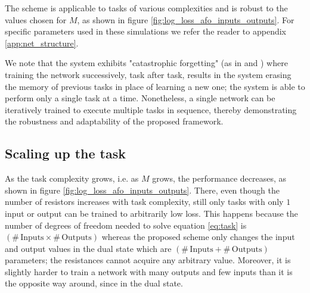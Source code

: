 \documentclass[%
 reprint,
 amsmath,amssymb,
 aps,
]{revtex4-2}
\begin{document}
    The scheme is applicable to tasks of various complexities and is robust to the values chosen for $M$, as shown in figure \ref{fig:log_loss_afo_inputs_outputs}. For specific parameters used in these simulations we refer the reader to appendix \ref{app:net_structure}.
    
    We note that the system exhibits "catastrophic forgetting" (as in \cite{FRENCH1999128} and \cite{stern2020continual}) where training the network successively, task after task, results in the system erasing the memory of previous tasks in place of learning a new one; the system is able to perform only a single task at a time. Nonetheless, a single network can be iteratively trained to execute multiple tasks in sequence, thereby demonstrating the robustness and adaptability of the proposed framework.

\subsection{Scaling up the task}\label{sec:scaling_up}

    As the task complexity grows, i.e. as $M$ grows, the performance decreases, as shown in figure \ref{fig:log_loss_afo_inputs_outputs}. There, even though the number of resistors increases with task complexity, still only tasks with only $1$ input or output can be trained to arbitrarily low loss. This happens because the number of degrees of freedom needed to solve equation \ref{eq:task} is $\left(\# \, \text{Inputs}\times \# \, \text{Outputs}\right)$ whereas the proposed scheme only changes the input and output values in the dual state which are $\left(\# \, \text{Inputs}+\# \, \text{Outputs}\right)$ parameters; the resistances cannot acquire any arbitrary value. Moreover, it is slightly harder to train a network with many outputs and few inputs than it is the opposite way around, since in the dual state. 
    
\end{document}
